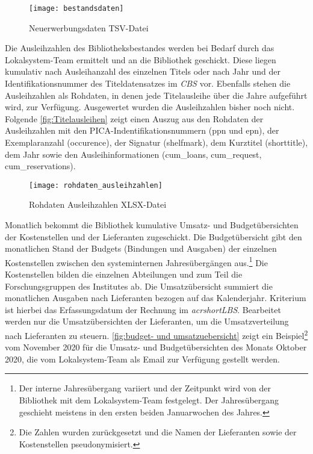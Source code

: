 \begin{figure}[H]
    \centering
        \texttt{[image: bestandsdaten]}
        \caption{Neuerwerbungsdaten TSV-Datei}
        \label{fig:Bestandsdaten}
\end{figure}


Die Ausleihzahlen des Bibliotheksbestandes werden bei Bedarf durch das Lokalsystem-Team ermittelt und an die Bibliothek geschickt. 
Diese liegen kumulativ nach Ausleihanzahl des einzelnen Titels oder nach Jahr und der Identifikationsnummer des Titeldatensatzes im 
\textit{\acrshort{CBS}} vor. Ebenfalls stehen die Ausleihzahlen als Rohdaten, in denen jede Titelausleihe über die Jahre aufgeführt wird, zur Verfügung.
Ausgewertet wurden die Ausleihzahlen bisher noch nicht. Folgende \autoref{fig:Titelausleihen} zeigt einen Auszug aus den Rohdaten der Ausleihzahlen mit 
den PICA-Indentifikationsnummern (ppn und epn), der Exemplaranzahl (occurence), der Signatur (shelfmark), dem Kurztitel (shorttitle),
dem Jahr sowie den Ausleihinformationen (cum\_loans, cum\_request, cum\_reservations).


\begin{figure}[H]
    \centering
        \texttt{[image: rohdaten\_ausleihzahlen]}
        \caption{Rohdaten Ausleihzahlen XLSX-Datei}
        \label{fig:Titelausleihen}
\end{figure}


Monatlich bekommt die Bibliothek kumulative Umsatz- und Budgetübersichten der Kostenstellen und der Lieferanten zugeschickt.
Die Budgetübersicht gibt den monatlichen Stand der Budgets (Bindungen und Ausgaben) der einzelnen Kostenstellen zwischen den systeminternen Jahresübergängen aus.\footnote{ Der
interne Jahresübergang variiert und der Zeitpunkt wird von der Bibliothek mit dem Lokalsystem-Team festgelegt. Der Jahresübergang geschieht meistens in den ersten beiden Januarwochen des Jahres.}
Die Kostenstellen bilden die einzelnen Abteilungen und zum Teil die Forschungsgruppen des Institutes ab.
Die Umsatzübersicht summiert die monatlichen Ausgaben nach Lieferanten bezogen auf das Kalenderjahr. Kriterium ist hierbei das Erfassungsdatum der Rechnung im \textit{acrshort{LBS}}. 
Bearbeitet werden nur die Umsatzübersichten der Lieferanten, um die Umsatzverteilung nach Lieferanten zu steuern.
\autoref{fig:budget- und umsatzuebersicht} zeigt ein Beispiel\footnote{ Die Zahlen wurden zurückgesetzt und die Namen der Lieferanten sowie der Kostenstellen pseudonymisiert.} vom November 2020 für die Umsatz- und Budgetübersichten des Monats Oktober 2020, die vom Lokalsystem-Team als Email zur Verfügung gestellt werden.


